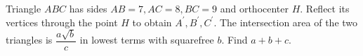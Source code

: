 Triangle $ABC$ has sides $AB=7,AC=8,BC=9$ and orthocenter $H$. Reflect its vertices through the point $H$ to obtain $A^{\prime},B^{\prime},C^{\prime}$. The intersection area of the two triangles is $\dfrac{a\sqrt b}{c}$ in lowest terms with squarefree $b$. Find $a+b+c$.
